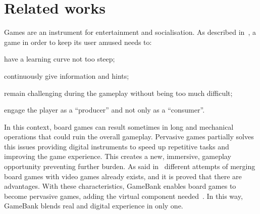 \section{Related works}
\label{related_works}

Games are an instrument for entertainment and socialisation. As described 
in~\cite{gee03}, a game in order to keep its user amused needs to:
\begin{enumerate*}[label=\roman*)]
 \item have a learning curve not too steep;
 \item continuously give information and hints;
 \item remain challenging during the gameplay without being too much difficult;
 \item engage the player as a ``producer'' and not only as a ``consumer''.
\end{enumerate*}
In this context, board games can result sometimes in long and mechanical 
operations that could ruin the overall gameplay. Pervasive games partially 
solves this issues providing digital instruments to speed up repetitive 
tasks and improving the game experience. This creates a new, immersive, 
gameplay opportunity preventing further burden.
As said in~\cite{mandryk02} different attempts of merging board games with video 
games already exists, and it is proved that there are advantages.
With these characteristics, GameBank enables board games to become pervasive 
games, adding the virtual component needed~\cite{arango17}. 
In this way, GameBank blends real and digital experience in only one.
